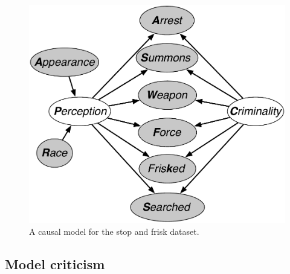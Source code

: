 \begin{figure}[th]
\begin{center}
\vspace{-1ex}
\centerline{\includegraphics[width=\columnwidth]{stop_and_frisk_model3.pdf}}
\vspace{-2ex}
\caption{A causal model for the stop and frisk dataset.\label{figure.stop_and_frisk}}
\vspace{-2ex}
\end{center}
\end{figure}


\subsection{Model criticism}
